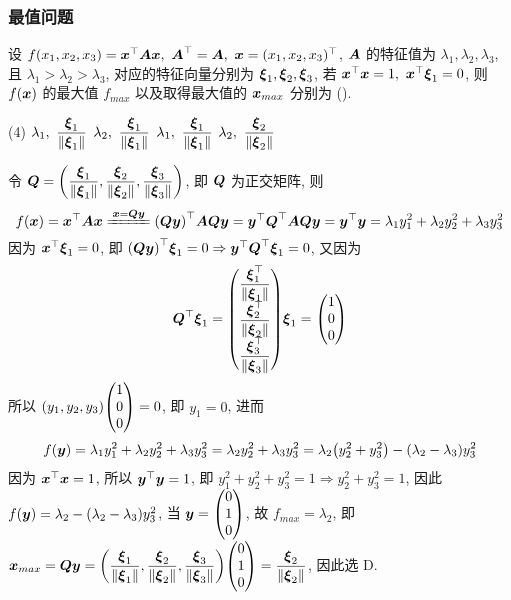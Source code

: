 \subsubsection{最值问题}

\begin{example}
    设 $f(x_1, x_2, x_3)=\vb*{x}^\top\vb*{Ax},~\vb*{A}^\top=\vb*{A},~\vb*{x}=(x_1, x_2, x_3)^\top$, $\vb*{A}$ 的特征值为 $\lambda_1, \lambda_2, \lambda_3$, 且 $\lambda_1> \lambda_2> \lambda_3$, 
    对应的特征向量分别为 $\vb*{\xi}_1, \vb*{\xi}_2, \vb*{\xi}_3$, 若 $\vb*{x}^\top\vb*{x}=1,~\vb*{x}^\top\vb*{\xi}_1=0$, 则 $f(\vb*{x})$ 的最大值 $f_{max}$ 以及取得最大值的 $\vb*{x}_{max}$ 分别为 (\quad).
    \begin{tasks}(4)
        \task $\lambda_1,~\dfrac{\vb*{\xi}_1}{\norm{\vb*{\xi}_1}}$
        \task $\lambda_2,~\dfrac{\vb*{\xi}_1}{\norm{\vb*{\xi}_1}}$
        \task $\lambda_1,~\dfrac{\vb*{\xi}_1}{\norm{\vb*{\xi}_1}}$
        \task $\lambda_2,~\dfrac{\vb*{\xi}_2}{\norm{\vb*{\xi}_2}}$
    \end{tasks}
\end{example}
\begin{solution}
    令 $\vb*{Q}=\qty(\dfrac{\vb*{\xi}_1}{\norm{\vb*{\xi}_1}}, \dfrac{\vb*{\xi}_2}{\norm{\vb*{\xi}_2}}, \dfrac{\vb*{\xi}_3}{\norm{\vb*{\xi}_3}})$, 即 $\vb*{Q}$ 为正交矩阵, 则 $$
    f(\vb*{x})=\vb*{x}^\top\vb*{Ax}\xlongequal{\vb*{x}=\vb*{Qy}}\qty(\vb*{Qy})^\top\vb*{A}\vb*{Qy}=\vb*{y}^\top\vb*{Q}^\top\vb*{A}\vb*{Q}\vb*{y}=\vb*{y}^\top\vb*{y}=\lambda_1y_1^2+ \lambda_2y_2^2+ \lambda_3y_3^2
    $$
    因为 $\vb*{x}^\top\vb*{\xi}_1=0$, 即 $\qty(\vb*{Qy})^\top\vb*{\xi}_1=0\Rightarrow \vb*{y}^\top\vb*{Q}^\top\vb*{\xi}_1=0$, 又因为 $$
    \vb*{Q}^\top\vb*{\xi}_1=\mqty(\dfrac{\vb*{\xi}_1^\top}{\norm{\vb*{\xi}_1}}\\[6pt]\dfrac{\vb*{\xi}_2^\top}{\norm{\vb*{\xi}_2}}\\[6pt]\dfrac{\vb*{\xi}_3^\top}{\norm{\vb*{\xi}_3}})\vb*{\xi}_1=\mqty(1\\0\\0)
    $$
    所以 $(y_1, y_2, y_3)\mqty(1\\0\\0)=0$, 即 $y_1=0$, 进而 $$f(\vb*{y})=\lambda_1y_1^2+ \lambda_2y_2^2+ \lambda_3y_3^2=\lambda_2y_2^2+\lambda_3y_3^2=\lambda_2\qty(y_2^2+y_3^2)-(\lambda_2-\lambda_3)y_3^2$$
    因为 $\vb*{x}^\top\vb*{x}=1$, 所以 $\vb*{y}^\top\vb*{y}=1$, 即 $y_1^2 +y_2^2+ y_3^2=1\Rightarrow y_2^2+y_3^2=1$, 因此 $f(\vb*{y})=\lambda_2-(\lambda_2-\lambda_3)y_3^2$, 当 $\vb*{y}=\mqty(0\\1\\0)$, 故 $f_{max}=\lambda_2$, 
    即 $\vb*{x}_{max}=\vb*{Qy}=\qty(\dfrac{\vb*{\xi}_1}{\norm{\vb*{\xi}_1}}, \dfrac{\vb*{\xi}_2}{\norm{\vb*{\xi}_2}}, \dfrac{\vb*{\xi}_3}{\norm{\vb*{\xi}_3}})\mqty(0\\1\\0)=\dfrac{\vb*{\xi}_2}{\norm{\vb*{\xi}_2}}$, 因此选 D.
\end{solution}

